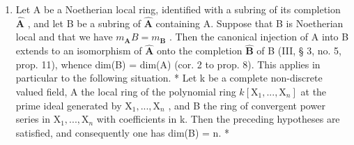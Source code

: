\begin{enumerate}
\def\labelenumi{\arabic{enumi})}
\setcounter{enumi}{1}
\tightlist
\item
  Let A be a Noetherian local ring, identified with a subring of its completion \(\hat{\mathbf{A}}\) , and let B be a subring of \(\hat{\mathbf{A}}\) containing A. Suppose that B is Noetherian local and that we have \(m_{\mathbf{A}}B = m_{\mathbf{B}}\) . Then the canonical injection of A into B extends to an isomorphism of \(\hat{\mathbf{A}}\) onto the completion \(\hat{\mathbf{B}}\) of B (III, § 3, no. 5, prop. 11), whence dim(B) = dim(A) (cor. 2 to prop. 8). This applies in particular to the following situation. * Let k be a complete non-discrete valued field, A the local ring of the polynomial ring \(k[\mathrm{X}_1, ..., \mathrm{X}_n]\) at the prime ideal generated by \(\mathrm{X}_1, ..., \mathrm{X}_n\) , and B the ring of convergent power series in \(\mathrm{X}_1, ..., \mathrm{X}_n\) with coefficients in k. Then the preceding hypotheses are satisfied, and consequently one has dim(B) = n. *
\end{enumerate}

